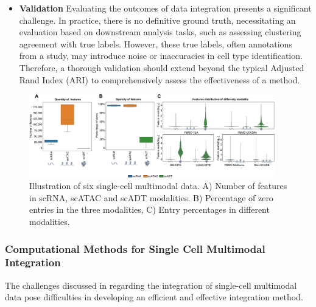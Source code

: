 \begin{itemize}
	\item \textbf{Validation} 
	Evaluating the outcomes of data integration presents a significant challenge. In practice, there is no definitive ground truth, necessitating an evaluation based on downstream analysis tasks, such as assessing clustering agreement with true labels. However, these true labels, often annotations from a study, may introduce noise or inaccuracies in cell type identification. Therefore, a thorough validation should extend beyond the typical Adjusted Rand Index (ARI) to comprehensively assess the effectiveness of a method.
\end{itemize}

\begin{figure}[!ht]
	\centering
	\includegraphics[width=0.95\textwidth]{feature_statistic/fig}
	\vspace{0.1cm}
	\caption[features characteristics comparison showing the challenge of multimodal integration.]{Illustration of six single-cell multimodal data. A) Number of features in scRNA, scATAC and scADT modalities. B) Percentage of zero entries in the three modalities, C) Entry percentages in different modalities.}
	\label{fig:modalities_differences}
\end{figure}


\subsubsection{Computational Methods for Single Cell Multimodal Integration}
\label{background:sec2:integration}
The challenges discussed in  regarding the integration of single-cell multimodal data pose difficulties in developing an efficient and effective integration method. 

